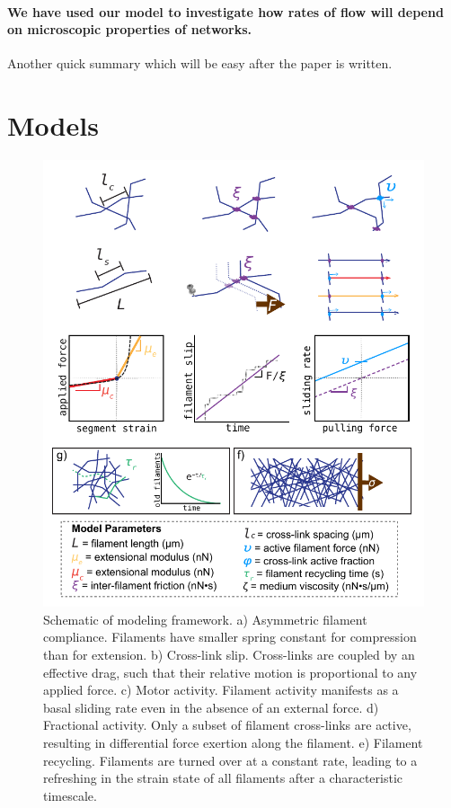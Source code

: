 \documentclass[10pt,letterpaper]{article}
\begin{document}
  

\paragraph{We have used our model to investigate how rates of flow will depend on microscopic properties of networks.}
Another quick summary which will be easy after the paper is written. 


\section*{Models}

\begin{figure}[h!]
\centering
\includegraphics[width=\hsize]{figures/fig2/fig2}
\caption{\label{fig:sim} Schematic of modeling framework. a) Asymmetric filament compliance.  Filaments have smaller spring constant for compression than for extension. b) Cross-link slip.  Cross-links are coupled by an effective drag, such that their relative motion is proportional to any applied force. c) Motor activity. Filament activity manifests as a basal sliding rate even in the absence of an external force. d) Fractional activity.  Only a subset of filament cross-links are active, resulting in differential force exertion along the filament.  e)  Filament recycling.  Filaments are turned over at a constant rate, leading to a refreshing in the strain state of all filaments after a characteristic timescale.}
\end{figure}
\end{document}

